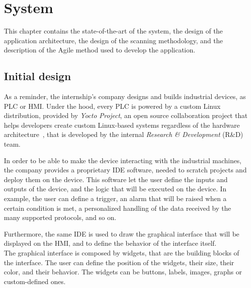 \chapter{System}

This chapter contains the state-of-the-art of the system, the design of the application architecture, the design of the scanning methodology, and the description of the Agile method used to develop the application.



\section{Initial design}

As a reminder, the internship's company designs and builds industrial devices, as PLC or HMI. Under the hood, every PLC is powered by a custom Linux distribution, provided by \textit{Yocto Project}, an open source collaboration project that helps developers create custom Linux-based systems regardless of the hardware architecture~\cite{yocto-project}, that is developed by the internal \textit{Research \& Development} (R\&D) team.

In order to be able to make the device interacting with the industrial machines, the company provides a proprietary IDE software, needed to scratch projects and deploy them on the device. This software let the user define the inputs and outputs of the device, and the logic that will be executed on the device. In example, the user can define a trigger, an alarm that will be raised when a certain condition is met, a personalized handling of the data received by the many supported protocols, and so on.

Furthermore, the same IDE is used to draw the graphical interface that will be displayed on the HMI, and to define the behavior of the interface itself.\\
The graphical interface is composed by widgets, that are the building blocks of the interface. The user can define the position of the widgets, their size, their color, and their behavior. The widgets can be buttons, labels, images, graphs or custom-defined ones.

